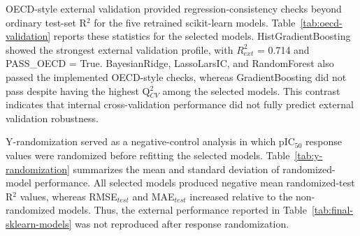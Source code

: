 \documentclass[11pt]{article}
\begin{document}
OECD-style external validation provided regression-consistency checks beyond ordinary test-set R$^2$ for the five retrained scikit-learn models. Table~\ref{tab:oecd-validation} reports these statistics for the selected models. HistGradientBoosting showed the strongest external validation profile, with $R^2_{ext}$ = 0.714 and PASS\_OECD = True. BayesianRidge, LassoLarsIC, and RandomForest also passed the implemented OECD-style checks, whereas GradientBoosting did not pass despite having the highest Q$^2_{CV}$ among the selected models. This contrast indicates that internal cross-validation performance did not fully predict external validation robustness.

\begin{table}[htbp]
\centering
\scriptsize
\setlength{\tabcolsep}{3pt}
\caption[OECD-style external validation statistics]{OECD-style external validation statistics for the selected scikit-learn regression models.}
\label{tab:oecd-validation}
\end{table}

Y-randomization served as a negative-control analysis in which pIC$_{50}$ response values were randomized before refitting the selected models. Table~\ref{tab:y-randomization} summarizes the mean and standard deviation of randomized-model performance. All selected models produced negative mean randomized-test R$^2$ values, whereas RMSE$_{test}$ and MAE$_{test}$ increased relative to the non-randomized models. Thus, the external performance reported in Table~\ref{tab:final-sklearn-models} was not reproduced after response randomization.
\end{document}
